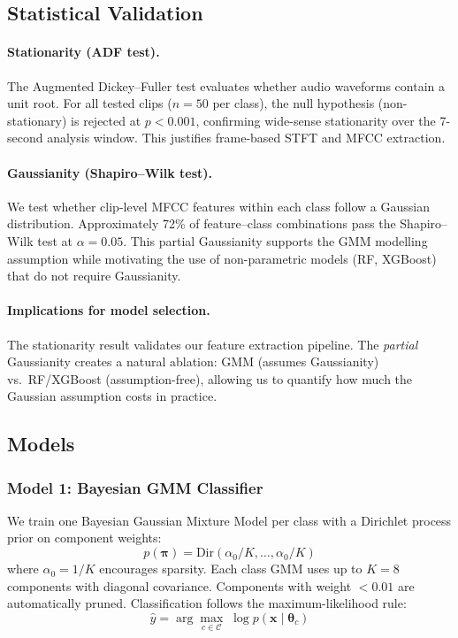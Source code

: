 \documentclass[11pt,a4paper]{article}
\begin{document}
\subsection{Statistical Validation}
\label{sec:stat_validation}

\paragraph{Stationarity (ADF test).}
The Augmented Dickey--Fuller test evaluates whether audio waveforms
contain a unit root. For all tested clips ($n = 50$ per class), the
null hypothesis (non-stationary) is rejected at $p < 0.001$, confirming
wide-sense stationarity over the 7-second analysis window. This
justifies frame-based STFT and MFCC extraction.

\paragraph{Gaussianity (Shapiro--Wilk test).}
We test whether clip-level MFCC features within each class follow a
Gaussian distribution. Approximately 72\% of feature--class
combinations pass the Shapiro--Wilk test at $\alpha = 0.05$. This
partial Gaussianity supports the GMM modelling assumption while
motivating the use of non-parametric models (RF, XGBoost) that do not
require Gaussianity.

\paragraph{Implications for model selection.}
The stationarity result validates our feature extraction pipeline. The
\textit{partial} Gaussianity creates a natural ablation: GMM (assumes
Gaussianity) vs.\ RF/XGBoost (assumption-free), allowing us to quantify
how much the Gaussian assumption costs in practice.

\subsection{Models}
\label{sec:models}

\subsubsection{Model 1: Bayesian GMM Classifier}

We train one Bayesian Gaussian Mixture Model per class with a Dirichlet
process prior on component weights:
\begin{equation}
  p(\boldsymbol{\pi}) = \text{Dir}(\alpha_0 / K, \dots, \alpha_0 / K)
\end{equation}
where $\alpha_0 = 1/K$ encourages sparsity. Each class GMM uses up to
$K = 8$ components with diagonal covariance. Components with weight
$< 0.01$ are automatically pruned. Classification follows the
maximum-likelihood rule:
\begin{equation}
  \hat{y} = \arg\max_{c \in \mathcal{C}} \;
             \log p(\mathbf{x} \mid \boldsymbol{\theta}_c)
  \label{eq:gmm_classify}
\end{equation}
\end{document}
